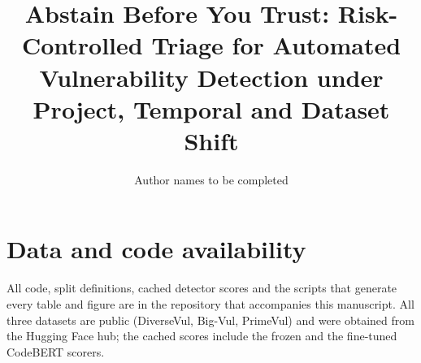 \documentclass[preprint,12pt,authoryear]{elsarticle}
\begin{document}
\begin{frontmatter}
\title{Abstain Before You Trust: Risk-Controlled Triage for Automated Vulnerability Detection under Project, Temporal and Dataset Shift}
\author{Author names to be completed}
\address{Affiliations to be completed}

\end{frontmatter}










\section*{Data and code availability}
All code, split definitions, cached detector scores and the scripts that generate every table and figure are in the repository that accompanies this manuscript. All three datasets are public (DiverseVul, Big-Vul, PrimeVul) and were obtained from the Hugging Face hub; the cached scores include the frozen and the fine-tuned CodeBERT scorers.



\end{document}

